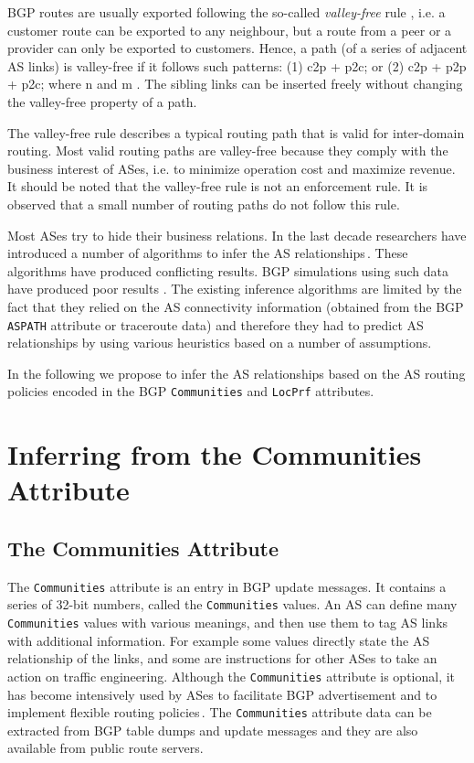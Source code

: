 \documentclass[conference]{IEEEtran}
\begin{document}
BGP routes are usually exported following the so-called \textit{valley-free} rule \cite{gao1}, i.e. a customer route can be exported to any neighbour, but a route from a peer or a provider can only be exported to customers. Hence, a path (of a series of adjacent AS links) is valley-free if it follows such patterns:
(1) c2p + p2c; or (2) c2p + p2p + p2c; where n and m .
The sibling links can be inserted freely without changing the valley-free property of a path. 

The valley-free rule describes a typical routing path that is valid for inter-domain routing. Most valid routing paths are valley-free because they comply with the business interest of ASes, i.e. to minimize operation cost and maximize revenue. 
It should be noted that the valley-free rule is not an enforcement rule. It is observed that a small number of routing paths do not follow this rule.

Most ASes try to hide their business relations. In the last decade researchers have introduced a number of algorithms to infer the AS  relationships\,\cite{gao1,Xia:2004, Subramanian1,Erlebach1, Battista2, Dimitropoulos2, Oliveira2, Weinsberg1}. These algorithms have produced conflicting results. BGP simulations using such data have produced poor results \cite{Muhlbauer:2006,Muhlbauer:2007}.
The existing inference algorithms are  limited by the fact that they  relied on the AS connectivity information (obtained from the BGP {\tt ASPATH} attribute or traceroute data) and therefore they had to predict AS relationships by using various heuristics based on a number of assumptions. 


In the following we propose to infer the AS relationships based on the AS routing policies encoded in the BGP {\tt Communities} and {\tt LocPrf}  attributes.

\section{Inferring from the {Communities} Attribute}

\subsection{The {Communities} Attribute}

The {\tt Communities} attribute is an entry in BGP update messages. It contains a series of 32-bit numbers, called the {\tt Communities} values. An AS can define many  {\tt Communities}  values with various meanings, and then use them to tag AS links with additional information. For example some values  directly state the AS relationship of the links, and some are instructions for  other ASes to take an action on traffic engineering. Although the {\tt Communities} attribute is optional, it has become intensively used by ASes to facilitate BGP advertisement and to implement flexible routing  policies\,\cite{Donnet2}. 
The {\tt Communities} attribute data can be extracted from  BGP table dumps and update messages and they are also available from public route servers.
\end{document}
